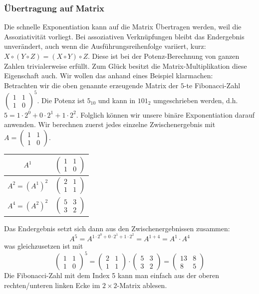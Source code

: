 \documentclass[course=erap]{aspdoc}
\begin{document}
\subsubsection{Übertragung auf Matrix}
Die schnelle Exponentiation kann auf die Matrix Übertragen werden, weil die Assoziativität vorliegt. Bei assoziativen Verknüpfungen bleibt das Endergebnis unverändert, auch wenn die Ausführungsreihenfolge variiert, kurz: $X \circ (Y \circ Z) = (X \circ Y) \circ Z$. Diese ist bei der Potenz-Berechnung von ganzen Zahlen trivialerweise erfüllt. Zum Glück besitzt die Matrix-Multiplikation diese Eigenschaft auch. Wir wollen das anhand eines Beispiel klarmachen: 
\\Betrachten wir die oben genannte erzeugende Matrix der $5$-te Fibonacci-Zahl $\begin{pmatrix} 1 &1 \\ 1 &0 \end{pmatrix}^5$.
Die Potenz ist $5_{10}$ und kann in $101_2$ umgeschrieben werden, d.h. $5 = 1 \cdot 2^0 + 0 \cdot 2^1 + 1 \cdot 2^2$.
Folglich können wir unsere binäre Exponentiation darauf anwenden. Wir berechnen zuerst jedes einzelne Zwischenergebnis mit $A = \begin{pmatrix} 1 &1 \\ 1 &0 \end{pmatrix}$.
\begin{center}
    \begin{tabular}{c|c}
    $A^1$  &$\begin{pmatrix} 1 &1 \\ 1 &0 \end{pmatrix}$ \\
    \hline
    $A^2 = (A^1)^2$ &$\begin{pmatrix} 2 &1 \\ 1 &1 \end{pmatrix}$ \\
    \hline
    $A^4 = (A^2)^2$ &$\begin{pmatrix} 5 &3 \\ 3 &2 \end{pmatrix}$
    \end{tabular}
\end{center}
Das Endergebnis setzt sich dann aus den Zwischenergebnissen zusammen: 
\[A^5 = A^{1\cdot2^0+0\cdot2^1+1\cdot2^2}=A^{1+4}=A^1 \cdot A^4\]
was gleichzusetzen ist mit
\[\begin{pmatrix} 1 &1 \\ 1 &0 \end{pmatrix}^5 = \begin{pmatrix} 2 &1 \\ 1 &1 \end{pmatrix} \cdot \begin{pmatrix} 5 &3 \\ 3 &2 \end{pmatrix} = \begin{pmatrix} 13 &8 \\ 8 &5 \end{pmatrix}\]
Die Fibonacci-Zahl mit dem Index 5 kann man einfach aus der oberen rechten/unteren linken Ecke im $2\times2$-Matrix ablesen.
\end{document}
